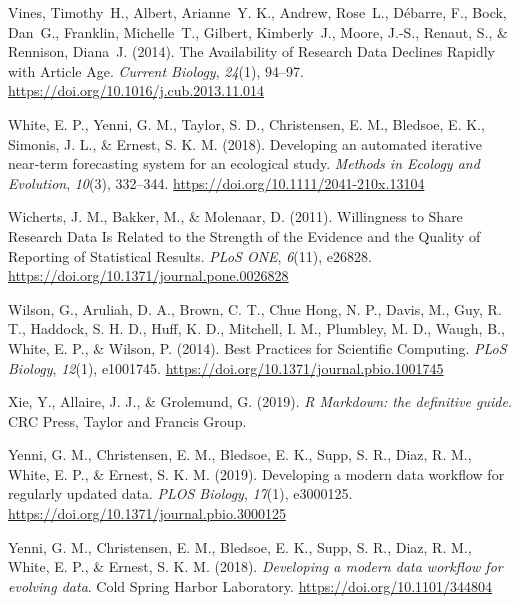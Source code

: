 \begin{CSLReferences}{1}{0}
\leavevmode{}%
Vines, Timothy~H., Albert, Arianne~Y. K., Andrew, Rose~L., Débarre, F., Bock, Dan~G., Franklin, Michelle~T., Gilbert, Kimberly~J., Moore, J.-S., Renaut, S., \& Rennison, Diana~J. (2014). The Availability of Research Data Declines Rapidly with Article Age. \emph{Current Biology}, \emph{24}(1), 94--97. \url{https://doi.org/10.1016/j.cub.2013.11.014}

\leavevmode{}%
White, E. P., Yenni, G. M., Taylor, S. D., Christensen, E. M., Bledsoe, E. K., Simonis, J. L., \& Ernest, S. K. M. (2018). Developing an automated iterative near‐term forecasting system for an ecological study. \emph{Methods in Ecology and Evolution}, \emph{10}(3), 332--344. \url{https://doi.org/10.1111/2041-210x.13104}

\leavevmode{}%
Wicherts, J. M., Bakker, M., \& Molenaar, D. (2011). Willingness to Share Research Data Is Related to the Strength of the Evidence and the Quality of Reporting of Statistical Results. \emph{PLoS ONE}, \emph{6}(11), e26828. \url{https://doi.org/10.1371/journal.pone.0026828}

\leavevmode{}%
Wilson, G., Aruliah, D. A., Brown, C. T., Chue Hong, N. P., Davis, M., Guy, R. T., Haddock, S. H. D., Huff, K. D., Mitchell, I. M., Plumbley, M. D., Waugh, B., White, E. P., \& Wilson, P. (2014). Best Practices for Scientific Computing. \emph{PLoS Biology}, \emph{12}(1), e1001745. \url{https://doi.org/10.1371/journal.pbio.1001745}

\leavevmode{}%
Xie, Y., Allaire, J. J., \& Grolemund, G. (2019). \emph{R Markdown: the definitive guide}. CRC Press, Taylor and Francis Group.

\leavevmode{}%
Yenni, G. M., Christensen, E. M., Bledsoe, E. K., Supp, S. R., Diaz, R. M., White, E. P., \& Ernest, S. K. M. (2019). Developing a modern data workflow for regularly updated data. \emph{PLOS Biology}, \emph{17}(1), e3000125. \url{https://doi.org/10.1371/journal.pbio.3000125}

\leavevmode{}%
Yenni, G. M., Christensen, E. M., Bledsoe, E. K., Supp, S. R., Diaz, R. M., White, E. P., \& Ernest, S. K. M. (2018). \emph{Developing a modern data workflow for evolving data}. Cold Spring Harbor Laboratory. \url{https://doi.org/10.1101/344804}

\end{CSLReferences}
